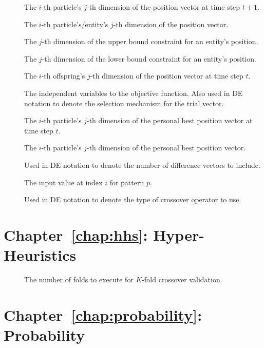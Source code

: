 \begin{description}
	\item [\parbox{2cm}{$x_{ij}(t+1)$}] \parbox{12.5cm}{The $i$-th particle's $j$-th dimension of the position vector at time step $t+1$.}
	\item [\parbox{2cm}{$x_{ij}$}] \parbox{12.5cm}{The $i$-th particle's/entity's $j$-th dimension of the position vector.}
	\item [\parbox{2cm}{$x_{max,j}$}] \parbox{12.5cm}{The $j$-th dimension of the upper bound constraint for an entity's position.}
	\item [\parbox{2cm}{$x_{min,j}$}] \parbox{12.5cm}{The $j$-th dimension of the lower bound constraint for an entity's position.}
	\item [\parbox{2cm}{$x'_{ij}(t)$}] \parbox{12.5cm}{The $i$-th offspring's $j$-th dimension of the position vector at time step $t$.}
	\item [\parbox{2cm}{$x$}] \parbox{12.5cm}{The independent variables to the objective function. Also used in \acs{DE} notation to denote the selection mechanism for the trial vector.}
	\item [\parbox{2cm}{$y_{ij}(t)$}] \parbox{12.5cm}{The $i$-th particle's $j$-th dimension of the personal best position vector at time step $t$.}
	\item [\parbox{2cm}{$y_{ij}$}] \parbox{12.5cm}{The $i$-th particle's $j$-th dimension of the personal best position vector.}
	\item [\parbox{2cm}{$y$}] \parbox{12.5cm}{Used in \acs{DE} notation to denote the number of difference vectors to include.}
	\item [\parbox{2cm}{$z_{i,p}$}] \parbox{12.5cm}{The input value at index $i$ for pattern $p$.}
	\item [\parbox{2cm}{$z$}] \parbox{12.5cm}{Used in \acs{DE} notation to denote the type of crossover operator to use.}
\end{description}

\section{Chapter~\ref{chap:hhs}: Hyper-Heuristics}
\label{sec:symbols:hhs}

\begin{description}
	\item [\parbox{2cm}{$K$}] \parbox{12.5cm}{The number of folds to execute for $K$-fold crossover validation.}
\end{description}

\section{Chapter~\ref{chap:probability}: Probability}
\label{sec:symbols:probability}

